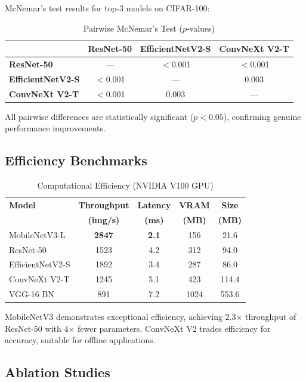 McNemar's test results for top-3 models on CIFAR-100:

\begin{table}[h]
\centering
\caption{Pairwise McNemar's Test ($p$-values)}
\begin{tabular}{lccc}
\hline
& \textbf{ResNet-50} & \textbf{EfficientNetV2-S} & \textbf{ConvNeXt V2-T} \\
\hline
\textbf{ResNet-50} & --- & $<$0.001 & $<$0.001 \\
\textbf{EfficientNetV2-S} & $<$0.001 & --- & 0.003 \\
\textbf{ConvNeXt V2-T} & $<$0.001 & 0.003 & --- \\
\hline
\end{tabular}
\end{table}

All pairwise differences are statistically significant ($p < 0.05$), confirming genuine performance improvements.

\subsection{Efficiency Benchmarks}

\begin{table}[h]
\centering
\caption{Computational Efficiency (NVIDIA V100 GPU)}
\begin{tabular}{lcccc}
\hline
\textbf{Model} & \textbf{Throughput} & \textbf{Latency} & \textbf{VRAM} & \textbf{Size} \\
& \textbf{(img/s)} & \textbf{(ms)} & \textbf{(MB)} & \textbf{(MB)} \\
\hline
MobileNetV3-L & \textbf{2847} & \textbf{2.1} & 156 & 21.6 \\
ResNet-50 & 1523 & 4.2 & 312 & 94.0 \\
EfficientNetV2-S & 1892 & 3.4 & 287 & 86.0 \\
ConvNeXt V2-T & 1245 & 5.1 & 423 & 114.4 \\
VGG-16 BN & 891 & 7.2 & 1024 & 553.6 \\
\hline
\end{tabular}
\end{table}

MobileNetV3 demonstrates exceptional efficiency, achieving 2.3× throughput of ResNet-50 with 4× fewer parameters. ConvNeXt V2 trades efficiency for accuracy, suitable for offline applications.

\subsection{Ablation Studies}

